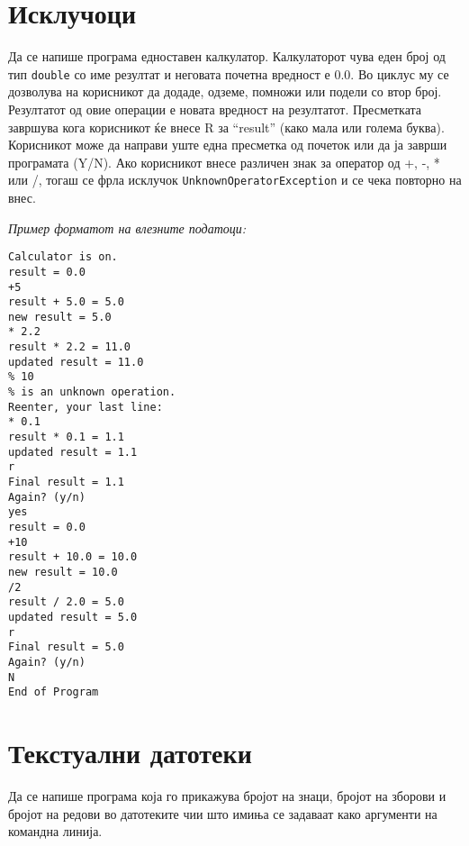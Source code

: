 

\lfoot{}
\cfoot{\thepage}
\rfoot{}
\usepackage{fancyvrb}
\usepackage{xcolor}
\usepackage{textcomp}


\begin{questions}

\section{Исклучоци}

\question
Да се напише програма едноставен калкулатор. Калкулаторот чува еден број од тип
\texttt{double} со име резултат и неговата почетна вредност е 0.0. Во циклус му
се дозволува на корисникот да додаде, одземе, помножи или подели со втор број.
Резултатот од овие операции е новата вредност на резултатот. Пресметката
завршува кога корисникот ќе внесе R за ``result'' (како мала или голема буква).
Корисникот може да направи уште една пресметка од почеток или да ја заврши
програмата (Y/N).
Ако корисникот внесе различен знак за оператор од +, -, * или /, тогаш се фрла
исклучок \texttt{UnknownOperatorException} и се чека повторно на внес.

\emph{Пример форматот на влезните податоци:}

\begin{verbatim}
Calculator is on.
result = 0.0
+5
result + 5.0 = 5.0
new result = 5.0
* 2.2
result * 2.2 = 11.0
updated result = 11.0
% 10
% is an unknown operation.
Reenter, your last line:
* 0.1
result * 0.1 = 1.1
updated result = 1.1
r
Final result = 1.1
Again? (y/n)
yes
result = 0.0
+10
result + 10.0 = 10.0
new result = 10.0
/2
result / 2.0 = 5.0
updated result = 5.0
r
Final result = 5.0
Again? (y/n)
N
End of Program
\end{verbatim}





\section{Текстуални датотеки}

\question
Да се напише програма која го прикажува бројот на знаци, бројот на зборови и
бројот на редови во датотеките чии што имиња се задаваат како аргументи на
командна линија.





\end{questions}
